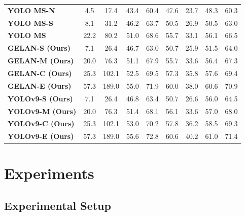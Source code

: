\documentclass[10pt,twocolumn,letterpaper]{article}
\begin{document}
\begin{table}[t]
\begin{threeparttable}[t]
\begin{tabular}{lcccccccc}
				\midrule
				\textbf{YOLO MS-N~\cite{chen2023yolo}} & 4.5 & 17.4 & 43.4 & 60.4 & 47.6 & 23.7 & 48.3 & 60.3 \\
				\textbf{YOLO MS-S~\cite{chen2023yolo}} & 8.1 & 31.2 & 46.2 & 63.7 & 50.5 & 26.9 & 50.5 & 63.0 \\
				\textbf{YOLO MS~\cite{chen2023yolo}} & 22.2 & 80.2 & 51.0 & 68.6 & 55.7 & 33.1 & 56.1 & 66.5 \\
				\midrule
				\textbf{GELAN-S (Ours)} & 7.1 & 26.4 & 46.7 & 63.0 & 50.7 & 25.9 & 51.5 & 64.0 \\
				\textbf{GELAN-M (Ours)} & 20.0 & 76.3 & 51.1 & 67.9 & 55.7 & 33.6 & 56.4 & 67.3 \\
				\textbf{GELAN-C (Ours)} & 25.3 & 102.1 & 52.5 & 69.5 & 57.3 & 35.8 & 57.6 & 69.4 \\
				\textbf{GELAN-E (Ours)} & 57.3 & 189.0 & 55.0 & 71.9 & 60.0 & 38.0 & 60.6 & 70.9 \\
				\midrule
				\textbf{YOLOv9-S (Ours)} & 7.1 & 26.4 & 46.8 & 63.4 & 50.7 & 26.6 & 56.0 & 64.5 \\
				\textbf{YOLOv9-M (Ours)} & 20.0 & 76.3 & 51.4 & 68.1 & 56.1 & 33.6 & 57.0 & 68.0 \\
				\textbf{YOLOv9-C (Ours)} & 25.3 & 102.1 & 53.0 & 70.2 & 57.8 & 36.2 & 58.5 & 69.3 \\
				\textbf{YOLOv9-E (Ours)} & 57.3 & 189.0 & 55.6 & 72.8 & 60.6 & 40.2 & 61.0 & 71.4 \\
				\bottomrule
			\end{tabular}
		\end{threeparttable}
		\vspace{-8pt}
	\end{table}
	
	\section{Experiments}
	
	\subsection{Experimental Setup}
	
\end{document}
